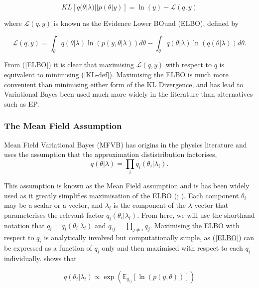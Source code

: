 \documentclass{article}\usepackage[]{graphicx}\usepackage[]{color}
\numberwithin{equation}{section}
\begin{document}
\begin{equation}
\label{KL-ELBO}
KL[q(\theta | \lambda)||p(\theta | y)] = \ln(y) - \mathcal{L}(q, y)
\end{equation}

where $\mathcal{L}(q, y)$ is known as the Evidence Lower BOund (ELBO), defined by

\begin{equation}
\label{ELBO}
\mathcal{L}(q, y) = \int_{\theta} q(\theta|\lambda) \ln (p(y, \theta|\lambda)) d\theta -  \int_{\theta} q(\theta|\lambda) \ln (q(\theta|\lambda)) d\theta.
\end{equation}

From (\ref{ELBO}) it is clear that maximising $\mathcal{L}(q, y)$ with respect to $q$ is equivalent to minimising (\ref{KL-def}). Maximising the ELBO is much more convenient than minimising either form of the KL Divergence, and has lead to Variational Bayes been used much more widely in the literature than alternatives such as EP.

\subsubsection{The Mean Field Assumption} 

Mean Field Variational Bayes (MFVB) has origins in the physics literature \citep{Chandler1987} and uses the assumption that the approximation dististribution factorises, 
\begin{equation}
\label{mf1}
q(\theta|\lambda) = \prod_i q_i(\theta_i | \lambda_i).
\end{equation}

This assumption is known as the Mean Field assumption and is has been widely used as it greatly simplifies maximisation of the ELBO (\citealp{Jordan1999}; \citealp{Bishop2006}). Each component $\theta_i$ may be a scalar or a vector, and $\lambda_i$ is the component of the $\lambda$ vector that parameterises the relevant factor $q_i(\theta_i |\lambda_i)$. From here, we will use the shorthand notation that $q_i = q_i(\theta_i|\lambda_i)$ and $q_{\setminus i} = \prod_{j\neq i}q_j$. Maximising the ELBO with respect to $q_i$ is analytically involved but computationally simple, as (\ref{ELBO}) can be expressed as a function of $q_i$ only and then maximised with respect to each $q_i$ individually. \citet{Attias1999} shows that 

\begin{equation}
\label{mf2}
q(\theta_i | \lambda_i) \propto\exp( \mathbb{E}_{q_{\setminus i}} [\ln(p(y,\theta))])
\end{equation}
\end{document}
